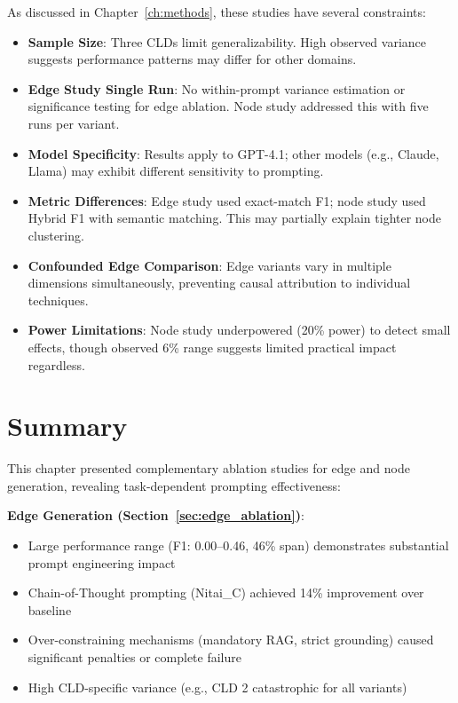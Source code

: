 As discussed in Chapter~\ref{ch:methods}, these studies have several constraints:
\begin{itemize}
    \item \textbf{Sample Size}: Three CLDs limit generalizability. High observed variance suggests performance patterns may differ for other domains.
    \item \textbf{Edge Study Single Run}: No within-prompt variance estimation or significance testing for edge ablation. Node study addressed this with five runs per variant.
    \item \textbf{Model Specificity}: Results apply to GPT-4.1; other models (e.g., Claude, Llama) may exhibit different sensitivity to prompting.
    \item \textbf{Metric Differences}: Edge study used exact-match F1; node study used Hybrid F1 with semantic matching. This may partially explain tighter node clustering.
    \item \textbf{Confounded Edge Comparison}: Edge variants vary in multiple dimensions simultaneously, preventing causal attribution to individual techniques.
    \item \textbf{Power Limitations}: Node study underpowered (20\% power) to detect small effects, though observed 6\% range suggests limited practical impact regardless.
\end{itemize}

\section{Summary}

This chapter presented complementary ablation studies for edge and node generation, revealing task-dependent prompting effectiveness:

\textbf{Edge Generation (Section~\ref{sec:edge_ablation})}:
\begin{itemize}
    \item Large performance range (F1: 0.00--0.46, 46\% span) demonstrates substantial prompt engineering impact
    \item Chain-of-Thought prompting (Nitai\_C) achieved 14\% improvement over baseline
    \item Over-constraining mechanisms (mandatory RAG, strict grounding) caused significant penalties or complete failure
    \item High CLD-specific variance (e.g., CLD 2 catastrophic for all variants)
\end{itemize}

